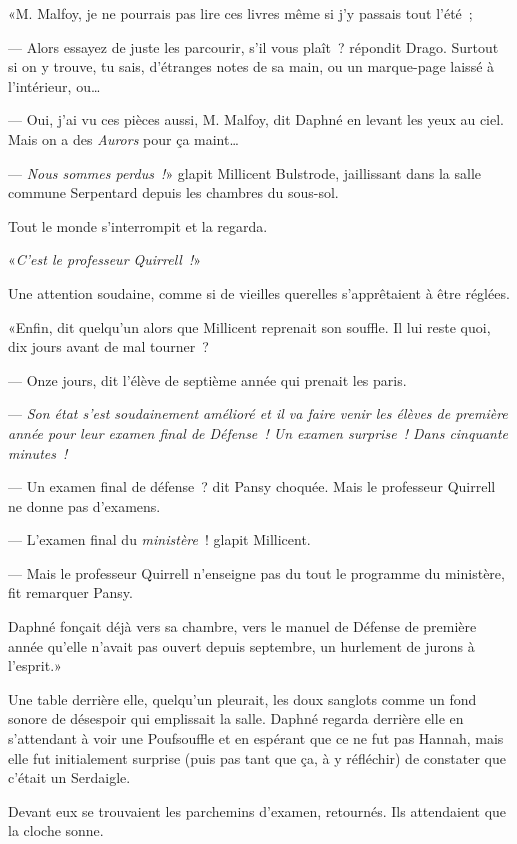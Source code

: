 «M. Malfoy, je ne pourrais pas lire ces livres même si j'y passais tout l'été~;

--- Alors essayez de juste les parcourir, s'il vous plaît~? répondit Drago. Surtout si on y trouve, tu sais, d'étranges notes de sa main, ou un marque-page laissé à l'intérieur, ou…

--- Oui, j'ai vu ces pièces aussi, M. Malfoy, dit Daphné en levant les yeux au ciel. Mais on a des \emph{Aurors} pour ça maint…

--- \emph{Nous sommes perdus~!}» glapit Millicent Bulstrode, jaillissant dans la salle commune Serpentard depuis les chambres du sous-sol.

Tout le monde s'interrompit et la regarda.

«\emph{C'est le professeur Quirrell~!}»

Une attention soudaine, comme si de vieilles querelles s'apprêtaient à être réglées.

«Enfin, dit quelqu'un alors que Millicent reprenait son souffle. Il lui reste quoi, dix jours avant de mal tourner~?

--- Onze jours, dit l'élève de septième année qui prenait les paris.

--- \emph{Son état s'est soudainement amélioré et il va faire venir les élèves de première année pour leur examen final de Défense~! Un examen surprise~! Dans cinquante minutes~!}

--- Un examen final de défense~? dit Pansy choquée. Mais le professeur Quirrell ne donne pas d'examens.

--- L'examen final du \emph{ministère}~! glapit Millicent.

--- Mais le professeur Quirrell n'enseigne pas du tout le programme du ministère, fit remarquer Pansy.

Daphné fonçait déjà vers sa chambre, vers le manuel de Défense de première année qu'elle n'avait pas ouvert depuis septembre, un hurlement de jurons à l'esprit.»

\later

Une table derrière elle, quelqu'un pleurait, les doux sanglots comme un fond sonore de désespoir qui emplissait la salle. Daphné regarda derrière elle en s'attendant à voir une Poufsouffle et en espérant que ce ne fut pas Hannah, mais elle fut initialement surprise (puis pas tant que ça, à y réfléchir) de constater que c'était un Serdaigle.

Devant eux se trouvaient les parchemins d'examen, retournés. Ils attendaient que la cloche sonne.

